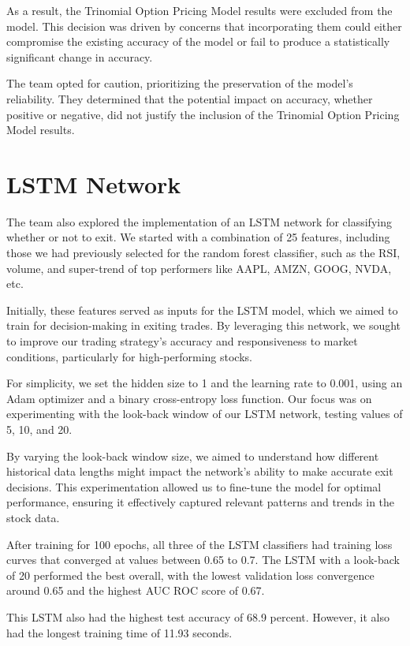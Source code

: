 \documentclass[11pt]{article}
\begin{document}
As a result, the Trinomial Option Pricing Model results were excluded from the model. This decision was driven by concerns that incorporating them could either compromise the existing accuracy of the model or fail to produce a statistically significant change in accuracy.

The team opted for caution, prioritizing the preservation of the model's reliability. They determined that the potential impact on accuracy, whether positive or negative, did not justify the inclusion of the Trinomial Option Pricing Model results.

\section{LSTM Network}
The team also explored the implementation of an LSTM network for classifying whether or not to exit. We started with a combination of 25 features, including those we had previously selected for the random forest classifier, such as the RSI, volume, and super-trend of top performers like AAPL, AMZN, GOOG, NVDA, etc.

Initially, these features served as inputs for the LSTM model, which we aimed to train for decision-making in exiting trades. By leveraging this network, we sought to improve our trading strategy's accuracy and responsiveness to market conditions, particularly for high-performing stocks.

For simplicity, we set the hidden size to 1 and the learning rate to 0.001, using an Adam optimizer and a binary cross-entropy loss function. Our focus was on experimenting with the look-back window of our LSTM network, testing values of 5, 10, and 20.

By varying the look-back window size, we aimed to understand how different historical data lengths might impact the network's ability to make accurate exit decisions. This experimentation allowed us to fine-tune the model for optimal performance, ensuring it effectively captured relevant patterns and trends in the stock data.

After training for 100 epochs, all three of the LSTM classifiers had training loss curves that converged at values between 0.65 to 0.7. The LSTM with a look-back of 20 performed the best overall, with the lowest validation loss convergence around 0.65 and the highest AUC ROC score of 0.67. 

This LSTM also had the highest test accuracy of 68.9 percent. However, it also had the longest training time of 11.93 seconds. 
\end{document}
